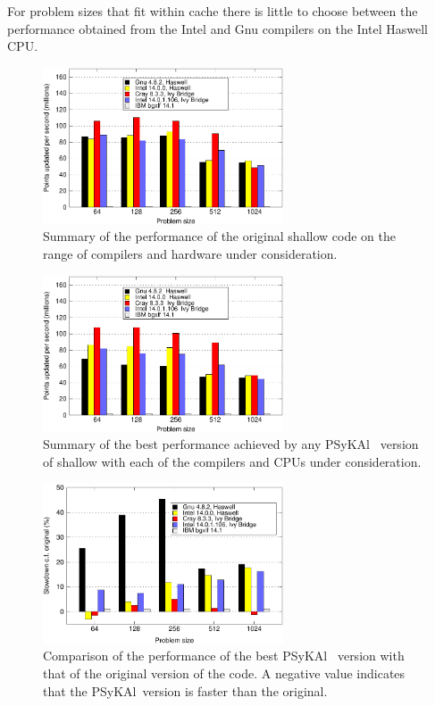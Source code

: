 \documentclass[journal]{IEEEtran}
\newcommand{\psykal}{{PS}y{KA}l\ }
\begin{document}
For problem sizes that fit within cache there is little to choose
between the performance obtained from the Intel and Gnu compilers on
the Intel Haswell CPU.

\begin{figure}[!t]
\centering
\includegraphics[width=2.8in]{orig_summary}
\caption{Summary of the performance of the original shallow code on 
the range of compilers and hardware under consideration.}
\label{FIG_orig_perf_summary}
\end{figure}

\begin{figure}[!t]
\centering
\includegraphics[width=2.8in]{best_psykal_summary}
\caption{Summary of the best performance achieved by any \psykal 
version of shallow with each of the compilers and CPUs under 
consideration.}
\label{FIG_best_psykal_perf_summary}
\end{figure}

\begin{figure}[!t]
\centering
\includegraphics[width=2.8in]{slowdown_summary}
\caption{Comparison of the performance of the best \psykal
version with that of the original version of the code. A negative value 
indicates that the \psykal version is faster than the original.}
\label{FIG_slowdown_summary}
\end{figure}
\end{document}
